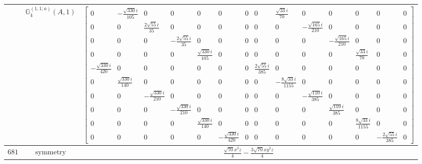 \documentclass[fleqn,8pt,landscape]{jsarticle}
\begin{document}
\begin{longtable}{ccc}
$  $ & $ \mathbb{G}_{4}^{(1,1;a)}(A,1) $ & $ \begin{bmatrix} 0 & - \frac{\sqrt{330} i}{105} & 0 & 0 & 0 & 0 & 0 & 0 & \frac{\sqrt{33} i}{70} & 0 & 0 & 0 & 0 & 0 \\ 0 & 0 & \frac{2 \sqrt{55} i}{35} & 0 & 0 & 0 & 0 & 0 & 0 & - \frac{\sqrt{165} i}{210} & 0 & 0 & 0 & 0 \\ 0 & 0 & 0 & - \frac{2 \sqrt{55} i}{35} & 0 & 0 & 0 & 0 & 0 & 0 & - \frac{\sqrt{165} i}{210} & 0 & 0 & 0 \\ 0 & 0 & 0 & 0 & \frac{\sqrt{330} i}{105} & 0 & 0 & 0 & 0 & 0 & 0 & \frac{\sqrt{33} i}{70} & 0 & 0 \\ - \frac{\sqrt{330} i}{420} & 0 & 0 & 0 & 0 & 0 & 0 & \frac{2 \sqrt{55} i}{385} & 0 & 0 & 0 & 0 & 0 & 0 \\ 0 & \frac{\sqrt{330} i}{140} & 0 & 0 & 0 & 0 & 0 & 0 & - \frac{8 \sqrt{33} i}{1155} & 0 & 0 & 0 & 0 & 0 \\ 0 & 0 & - \frac{\sqrt{330} i}{210} & 0 & 0 & 0 & 0 & 0 & 0 & - \frac{\sqrt{110} i}{385} & 0 & 0 & 0 & 0 \\ 0 & 0 & 0 & - \frac{\sqrt{330} i}{210} & 0 & 0 & 0 & 0 & 0 & 0 & \frac{\sqrt{110} i}{385} & 0 & 0 & 0 \\ 0 & 0 & 0 & 0 & \frac{\sqrt{330} i}{140} & 0 & 0 & 0 & 0 & 0 & 0 & \frac{8 \sqrt{33} i}{1155} & 0 & 0 \\ 0 & 0 & 0 & 0 & 0 & - \frac{\sqrt{330} i}{420} & 0 & 0 & 0 & 0 & 0 & 0 & - \frac{2 \sqrt{55} i}{385} & 0 \end{bmatrix} $ \\ \hline
$ 681 $ & $ \text{symmetry} $ & $ \frac{\sqrt{70} x^{3} z}{4} - \frac{3 \sqrt{70} x y^{2} z}{4} $ \\

\end{longtable}
\end{document}
